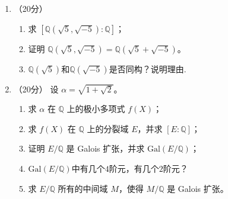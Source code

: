 \begin{enumerate}
\item （20分）
\begin{enumerate}
    \item 求 $[\mathbb{Q}(\sqrt{5}, \sqrt{-5}): \mathbb{Q}]$；
    \item 证明 $\mathbb{Q}(\sqrt{5}, \sqrt{-5}) = \mathbb{Q}(\sqrt{5} + \sqrt{-5})$。
    \item $\mathbb{Q}(\sqrt{5})$和$\mathbb{Q}(\sqrt{-5})$是否同构？说明理由.
\end{enumerate}

\item （20分）
设 $\alpha = \sqrt{1 + \sqrt{2}}$。
\begin{enumerate}
    \item 求 $\alpha$ 在 $\mathbb{Q}$ 上的极小多项式 $f(X)$；
    \item 求 $f(X)$ 在 $\mathbb{Q}$ 上的分裂域 $E$，并求 $[E: \mathbb{Q}]$；
    \item 证明 $E/\mathbb{Q}$ 是 Galois 扩张，并求 $\mathrm{Gal}(E/\mathbb{Q})$；
    \item $\text{Gal}(E/\mathbb{Q})$中有几个$4$阶元，有几个$2$阶元？
    \item 求 $E/\mathbb{Q}$ 所有的中间域 $M$，使得 $M/\mathbb{Q}$ 是 Galois 扩张。
\end{enumerate}
\end{enumerate}

